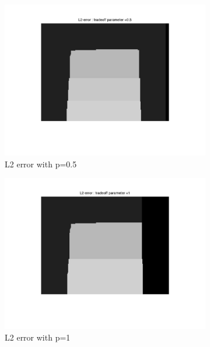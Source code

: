 \documentclass[fleqn]{article}
\begin{document}
\begin{figure}
 \begin{subfigure}{0.5\textwidth}
\includegraphics[scale=0.2]{./pics/map_L2_error_p=0.5.jpg}
\caption{L2 error with p=0.5}
\end{subfigure}
 \begin{subfigure}{0.5\textwidth}
\includegraphics[scale=0.2]{./pics/map_L2_error_p=1.jpg}
\caption{L2 error with p=1}
\end{subfigure}
 \begin{subfigure}{0.5\textwidth}

\end{subfigure}
\end{figure}
\end{document}
